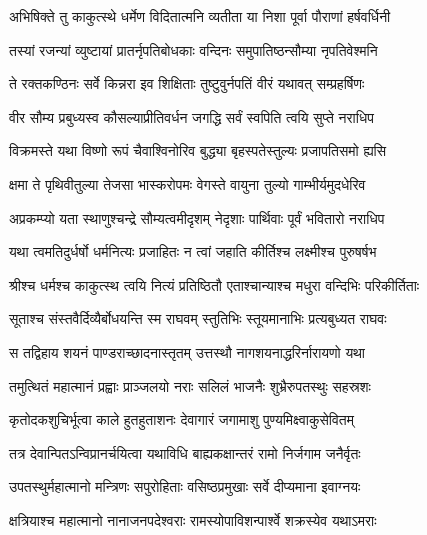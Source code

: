 
\twolineshloka
{अभिषिक्ते तु काकुत्स्थे धर्मेण विदितात्मनि}
{व्यतीता या निशा पूर्वा पौराणां हर्षवर्धिनी} %

\twolineshloka
{तस्यां रजन्यां व्युष्टायां प्रातर्नृपतिबोधकाः}
{वन्दिनः समुपातिष्ठन्सौम्या नृपतिवेश्मनि} %

\twolineshloka
{ते रक्तकण्ठिनः सर्वे किन्नरा इव शिक्षिताः}
{तुष्टुवुर्नपतिं वीरं यथावत् सम्प्रहर्षिणः} %

\twolineshloka
{वीर सौम्य प्रबुध्यस्व कौसल्याप्रीतिवर्धन}
{जगद्धि सर्वं स्वपिति त्वयि सुप्ते नराधिप} %

\twolineshloka
{विक्रमस्ते यथा विष्णो रूपं चैवाश्विनोरिव}
{बुद्ध्या बृहस्पतेस्तुल्यः प्रजापतिसमो ह्यसि} %

\twolineshloka
{क्षमा ते पृथिवीतुल्या तेजसा भास्करोपमः}
{वेगस्ते वायुना तुल्यो गाम्भीर्यमुदधेरिव} %

\twolineshloka
{अप्रकम्प्यो यता स्थाणुश्चन्द्रे सौम्यत्वमीदृशम्}
{नेदृशाः पार्थिवाः पूर्वं भवितारो नराधिप} %

\twolineshloka
{यथा त्वमतिदुर्धर्षो धर्मनित्यः प्रजाहितः}
{न त्वां जहाति कीर्तिश्च लक्ष्मीश्च पुरुषर्षभ} %

\twolineshloka
{श्रीश्च धर्मश्च काकुत्स्थ त्वयि नित्यं प्रतिष्ठितौ}
{एताश्चान्याश्च मधुरा वन्दिभिः परिकीर्तिताः} %

\twolineshloka
{सूताश्च संस्तवैर्दिव्यैर्बोधयन्ति स्म राघवम्}
{स्तुतिभिः स्तूयमानाभिः प्रत्यबुध्यत राघवः} %

\twolineshloka
{स तद्विहाय शयनं पाण्डराच्छादनास्तृतम्}
{उत्तस्थौ नागशयनाद्धरिर्नारायणो यथा} %

\twolineshloka
{तमुत्थितं महात्मानं प्रह्वाः प्राञ्जलयो नराः}
{सलिलं भाजनैः शुभ्रैरुपतस्थुः सहस्रशः} %

\twolineshloka
{कृतोदकशुचिर्भूत्वा काले हुतहुताशनः}
{देवागारं जगामाशु पुण्यमिक्ष्वाकुसेवितम्} %

\twolineshloka
{तत्र देवान्पितऽन्विप्रानर्चयित्वा यथाविधि}
{बाह्यकक्षान्तरं रामो निर्जगाम जनैर्वृतः} %

\twolineshloka
{उपतस्थुर्महात्मानो मन्त्रिणः सपुरोहिताः}
{वसिष्ठप्रमुखाः सर्वे दीप्यमाना इवाग्नयः} %

\twolineshloka
{क्षत्रियाश्च महात्मानो नानाजनपदेश्वराः}
{रामस्योपाविशन्पार्श्वे शक्रस्येव यथाऽमराः} %

